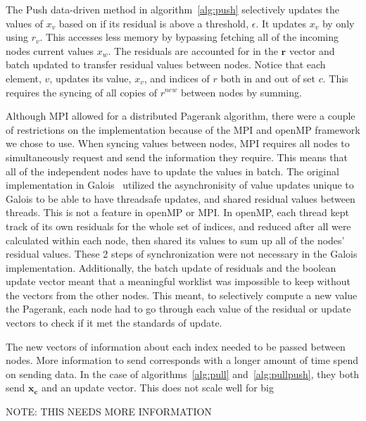 \documentclass[letterpaper,11pt,onecolumn]{article}
\begin{document}
The Push data-driven method in algorithm~\ref{alg:push} selectively updates the values of $x_v$ based on if its residual is above a threshold, $\epsilon$. It updates $x_v$ by only using $r_v$. This accesses less memory by bypassing fetching all of the incoming nodes current values $x_w$. The residuals are accounted for in the $\mathbf{r}$ vector and batch updated to transfer residual values between nodes. Notice that each element, $v$, updates its value, $x_v$, and indices of $r$ both in and out of set $c$. This requires the syncing of all copies of $r^{new}$ between nodes by summing. 

Although MPI allowed for a distributed Pagerank algorithm, there were a couple of restrictions on the implementation because of the MPI and openMP framework we chose to use. When syncing values between nodes, MPI requires all nodes to simultaneously request and send the information they require. This means that all of the independent nodes have to update the values in batch. The original implementation in Galois~\cite{Joyce} utilized the asynchronisity of value updates unique to Galois to be able to have threadsafe updates, and shared residual values between threads. This is not a feature in openMP or MPI. In openMP, each thread kept track of its own residuals for the whole set of indices, and reduced after all were calculated within each node, then shared its values to sum up all of the nodes' residual values. These 2 steps of synchronization were not necessary in the Galois implementation. Additionally, the batch update of residuals and the boolean update vector meant that a meaningful worklist was impossible to keep without the vectors from the other nodes. This meant, to selectively compute a new value the Pagerank, each node had to go through each value of the residual or update vectors to check if it met the standards of update. 

The new vectors of information about each index needed to be passed between nodes. More information to send corresponds with a longer amount of time spend on sending data. In the case of algorithms~\ref{alg:pull} and~\ref{alg:pullpush}, they both send $\mathbf{x_c}$ and an update vector. This does not scale well for big 

NOTE: THIS NEEDS MORE INFORMATION 
\end{document}
